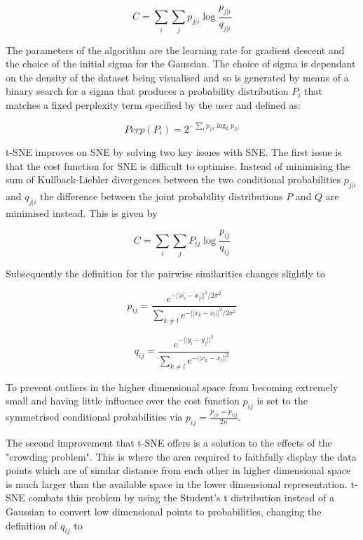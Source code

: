 \begin{equation}
	C = \sum\limits_i \sum\limits_j p_{j|i} \log \frac{p_{j|i}}{q_{j|i}}
\end{equation}

The parameters of the algorithm are the learning rate for gradient descent and the choice of the initial sigma for the Gaussian. The choice of sigma is dependant on the density of the dataset being visualised and so is generated by means of a binary search for a sigma that produces a probability distribution $P_{i}$ that matches a fixed perplexity term specified by the user and defined as:

\begin{equation}
	Perp(P_i) = 2^{- \sum\limits_i p_{j|i}\log_{2} p_{j|i}}
\end{equation}

t-SNE improves on SNE by solving two key issues with SNE. The first issue is that the cost function for SNE is difficult to optimise. Instead of minimising the sum of Kullback-Liebler divergences between the two conditional probabilities $p_{j|i}$ and $q_{j|i}$ the difference between the joint probability distributions $P$ and $Q$ are minimised instead. This is given by

\begin{equation}
	C = \sum\limits_i \sum\limits_j P_{ij} \log \frac{p_{ij}}{q_{ij}}
\end{equation}

Subsequently the definition for the pairwise similarities changes slightly to

\begin{equation}
	p_{ij} = \frac{e^{-||x_i - x_j ||^2 / 2\sigma^2}}{\sum_{k\neq l} e^{-||x_k - x_l ||^2 / 2\sigma^2}}
\end{equation}

\begin{equation}
	q_{ij} = \frac{e^{-||y_i - y_j ||^2}}{\sum_{k\neq l} e^{-||x_k - x_l ||^2}}
\end{equation}

To prevent outliers in the higher dimensional space from becoming extremely small and having little influence over the cost function $p_{ij}$ is set to the symmetrised conditional probabilities via $p_{ij} = \frac{p_{j|i} = p_{i|j}}{2n}$.

The second improvement that t-SNE offers is a solution to the effects of the "crowding problem". This is where the area required to faithfully display the data points which are of similar distance from each other in higher dimensional space is much larger than the available space in the lower dimensional representation. t-SNE combats this problem by using the Student's t distribution instead of a Gaussian to convert low dimensional points to probabilities, changing the definition of $q_{ij}$ to

